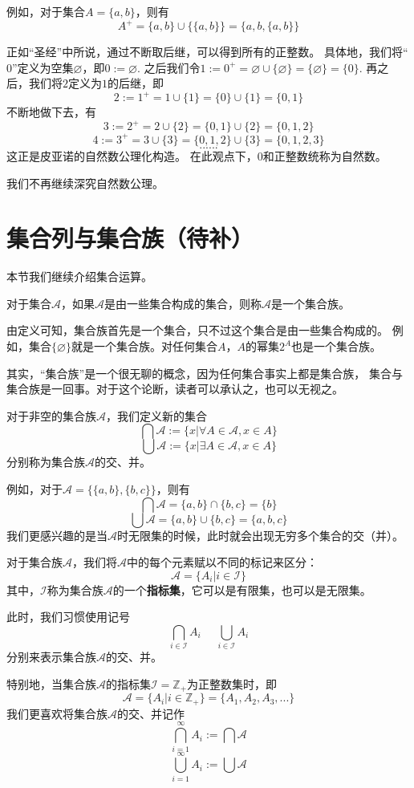 例如，对于集合$A=\{a,b\}$，则有
$$A^+=\{a,b\}\cup\{\{a,b\}\}=\{a,b,\{a,b\}\}$$

正如“圣经”中所说，通过不断取后继，可以得到所有的正整数。
具体地，我们将“$0$”定义为空集$\varnothing$，即$0:=\varnothing$.
之后我们令$1:=0^+=\varnothing\cup\{\varnothing\}=\{\varnothing\}=\{0\}$.
再之后，我们将$2$定义为$1$的后继，即
$$2:=1^+=1\cup\{1\}=\{0\}\cup\{1\}=\{0,1\}$$
不断地做下去，有
$$3:=2^+=2\cup\{2\}=\{0,1\}\cup\{2\}=\{0,1,2\}$$
$$4:=3^+=3\cup\{3\}=\{0,1,2\}\cup\{3\}=\{0,1,2,3\}$$
$$......$$
这正是皮亚诺的自然数公理化构造。
在此观点下，0和正整数统称为自然数。

我们不再继续深究自然数公理。

\section{集合列与集合族（待补）}
本节我们继续介绍集合运算。
\begin{definition}[集合族]
对于集合$\mathcal{A}$，如果$\mathcal{A}$是由一些集合构成的集合，则称$\mathcal{A}$是一个集合族。
\end{definition}
由定义可知，集合族首先是一个集合，只不过这个集合是由一些集合构成的。
例如，集合$\{\varnothing\}$就是一个集合族。对任何集合$A$，$A$的幂集$2^A$也是一个集合族。

其实，“集合族”是一个很无聊的概念，因为任何集合事实上都是集合族，
集合与集合族是一回事。对于这个论断，读者可以承认之，也可以无视之。

\begin{definition}[任意交与任意并]
对于非空的集合族$\mathcal{A}$，我们定义新的集合
$$\bigcap \mathcal{A}:=\{x|\forall A\in \mathcal{A},x\in A\}$$
$$\bigcup \mathcal{A}:=\{x|\exists A\in \mathcal{A},x\in A\}$$
分别称为集合族$\mathcal{A}$的交、并。
\end{definition}
例如，对于$\mathcal{A}=\{\{a,b\},\{b,c\}\}$，则有
$$\bigcap \mathcal{A}=\{a,b\}\cap\{b,c\}=\{b\}$$
$$\bigcup \mathcal{A}=\{a,b\}\cup\{b,c\}=\{a,b,c\}$$
我们更感兴趣的是当$\mathcal{A}$时无限集的时候，此时就会出现无穷多个集合的交（并）。\vs

对于集合族$\mathcal{A}$，我们将$\mathcal{A}$中的每个元素赋以不同的标记来区分：
$$\mathcal{A}=\{A_i|i\in\mathcal{I}\}$$
其中，$\mathcal{I}$称为集合族$\mathcal{A}$的一个\textbf{指标集}，它可以是有限集，也可以是无限集。

此时，我们习惯使用记号
$$\bigcap_{i\in\mathcal{I}}A_i\,\,\,\,\,\,\,\,\bigcup_{i\in\mathcal{I}}A_i$$
分别来表示集合族$\mathcal{A}$的交、并。

特别地，当集合族$\mathcal{A}$的指标集$\mathcal{I}=\mathbb{Z_+}$为正整数集时，即
$$\mathcal{A}=\{A_i|i\in\mathbb{Z}_+\}=\{A_1,A_2,A_3,...\}$$
我们更喜欢将集合族$\mathcal{A}$的交、并记作
$$\bigcap_{i=1}^{\infty}A_i:=\bigcap\mathcal{A}$$
$$\bigcup_{i=1}^{\infty}A_i:=\bigcup\mathcal{A}$$

